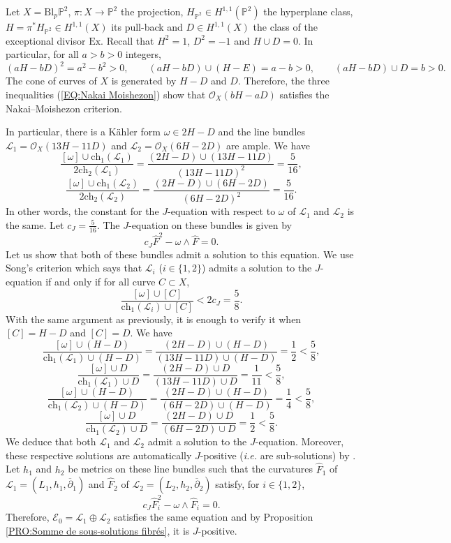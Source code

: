 \documentclass{article}
\theoremstyle{remark}
\theoremstyle{definition}
\renewcommand{\P}{\mathbb{P}}
\newcommand{\OX}{\mathcal{O}}
\newcommand{\E}{\mathcal{E}}
\newcommand{\mL}{\mathcal{L}}
\newcommand{\dbar}{\overline{\partial}}
\newcommand{\ch}{\mathrm{ch}}
\begin{document}
Let $X = \mathrm{Bl}_p\P^2$, $\pi : X \rightarrow \P^2$ the projection, $H_{\P^2} \in H^{1,1}(\P^2)$ the hyperplane class, $H = \pi^*H_{\P^2} \in H^{1,1}(X)$ its pull-back and $D \in H^{1,1}(X)$ the class of the exceptional divisor $\mathrm{Ex}$. Recall that $H^2 = 1$, $D^2 = -1$ and $H \cup D = 0$. In particular, for all $a > b > 0$ integers,
\begin{equation}\label{EQ:Nakai Moishezon}
    (aH - bD)^2 = a^2 - b^2 > 0, \qquad (aH - bD) \cup (H - E) = a - b > 0, \qquad (aH - bD) \cup D = b > 0.
\end{equation}
The cone of curves of $X$ is generated by $H - D$ and $D$. Therefore, the three inequalities (\ref{EQ:Nakai Moishezon}) show that $\OX_X(bH - aD)$ satisfies the Nakai--Moishezon criterion.

In particular, there is a Kähler form $\omega \in 2H - D$ and the line bundles $\mL_1 = \OX_X(13H - 11D)$ and $\mL_2 = \OX_X(6H - 2D)$ are ample. We have
$$
\frac{[\omega] \cup \ch_1(\mL_1)}{2\ch_2(\mL_1)} = \frac{(2H - D) \cup (13H - 11D)}{(13H - 11D)^2} = \frac{5}{16},
$$
$$
\frac{[\omega] \cup \ch_1(\mL_2)}{2\ch_2(\mL_2)} = \frac{(2H - D) \cup (6H - 2D)}{(6H - 2D)^2} = \frac{5}{16}.
$$
In other words, the constant for the $J$-equation with respect to $\omega$ of $\mL_1$ and $\mL_2$ is the same. Let $c_J = \frac{5}{16}$. The $J$-equation on these bundles is given by
$$
c_J\hat{F}^2 - \omega \wedge \hat{F} = 0.
$$
Let us show that both of these bundles admit a solution to this equation. We use Song's criterion \cite[Corollary 1.2]{Song} which says that $\mL_i$ ($i \in \{1,2\}$) admits a solution to the $J$-equation if and only if for all curve $C \subset X$,
$$
\frac{[\omega] \cup [C]}{\ch_1(\mL_i) \cup [C]} < 2c_J = \frac{5}{8}.
$$
With the same argument as previously, it is enough to verify it when $[C] = H - D$ and $[C] = D$. We have
$$
\frac{[\omega] \cup (H - D)}{\ch_1(\mL_1) \cup (H - D)} = \frac{(2H - D) \cup (H - D)}{(13H - 11D) \cup (H - D)} = \frac{1}{2} < \frac{5}{8},
$$
$$
\frac{[\omega] \cup D}{\ch_1(\mL_1) \cup D} = \frac{(2H - D) \cup D}{(13H - 11D) \cup D} = \frac{1}{11} < \frac{5}{8},
$$
$$
\frac{[\omega] \cup (H - D)}{\ch_1(\mL_2) \cup (H - D)} = \frac{(2H - D) \cup (H - D)}{(6H - 2D) \cup (H - D)} = \frac{1}{4} < \frac{5}{8},
$$
$$
\frac{[\omega] \cup D}{\ch_1(\mL_2) \cup D} = \frac{(2H - D) \cup D}{(6H - 2D) \cup D} = \frac{1}{2} < \frac{5}{8}.
$$
We deduce that both $\mL_1$ and $\mL_2$ admit a solution to the $J$-equation. Moreover, these respective solutions are automatically $J$-positive (\textit{i.e.} are sub-solutions) by \cite[Proof of Theorem 1.1]{Song_Weinkove}. Let $h_1$ and $h_2$ be metrics on these line bundles such that the curvatures $\hat{F}_1$ of $\mL_1 = (L_1,h_1,\dbar_1)$ and $\hat{F}_2$ of $\mL_2 = (L_2,h_2,\dbar_2)$ satisfy, for $i \in \{1,2\}$,
$$
c_J\hat{F}_i^2 - \omega \wedge \hat{F}_i = 0.
$$
Therefore, $\E_0 = \mL_1 \oplus \mL_2$ satisfies the same equation and by Proposition \ref{PRO:Somme de sous-solutions fibrés}, it is $J$-positive.
\end{document}
